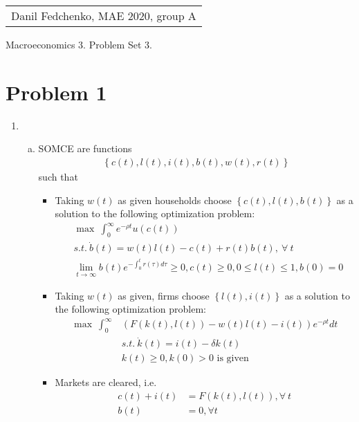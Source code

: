 \documentclass[a4paper]{article}
\begin{document}
	\begin{flushright}
	\begin{tabular}{r}
		Danil Fedchenko, MAE 2020, group A \\
	\end{tabular}
\end{flushright}


\begin{center}
	Macroeconomics 3. Problem Set 3.
\end{center}
\section*{Problem 1}
\begin{enumerate}[1.]
	\item \begin{enumerate}[(a)]
		\item SOMCE are functions
		\begin{align*}
		\left\{c(t), l(t), i(t), b(t), w(t), r(t)\right\}
		\end{align*}
		such that
		\begin{itemize}
			\item Taking $w(t)$ as given households choose $\left\{c(t), l(t), b(t)\right\}$ as a solution to the following optimization problem:
			\begin{align*}
			&\max\ \int_{0}^{\infty} e^{-\rho t}u(c(t))\\
			&s.t.\ \dot{b}(t) = w(t)l(t) -c(t) + r(t)b(t),\ \forall\ t\\
			&\lim_{t \to \infty} b(t)e^{-\int_{0}^t r(\tau)d\tau} \ge 0, c(t) \ge 0, 0 \le l(t) \le 1, b(0) = 0
			\end{align*}
			\item Taking $w(t)$ as given, firms choose $\left\{l(t), i(t)\right\}$ as a solution to the following optimization problem:
			\begin{align*}
			\max\ \int_{0}^{\infty} &(F(k(t), l(t)) - w(t)l(t) - i(t))e^{-\rho t}dt\\
			&s.t.\ \dot{k}(t) = i(t) - \delta k(t)\\
			&k(t) \ge 0, k(0) > 0 \text{ is given}
			\end{align*}
			\item Markets are cleared, i.e.
			\begin{align*}
			c(t) + i(t) &= F(k(t), l(t)), \forall\ t\\
			b(t) &= 0, \forall t
			\end{align*}
		\end{itemize}

\end{enumerate}
\end{enumerate}
\end{document}

